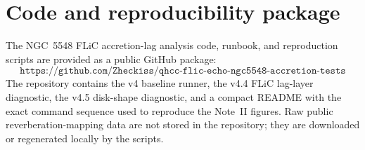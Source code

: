 \section{Code and reproducibility package}

The NGC~5548 FLiC accretion-lag analysis code, runbook, and reproduction scripts are provided as a public GitHub package:
\[
\texttt{https://github.com/Zheckiss/qhcc-flic-echo-ngc5548-accretion-tests}
\]
The repository contains the v4 baseline runner, the v4.4 FLiC lag-layer diagnostic, the v4.5 disk-shape diagnostic, and a compact README with the exact command sequence used to reproduce the Note~II figures.  Raw public reverberation-mapping data are not stored in the repository; they are downloaded or regenerated locally by the scripts.
